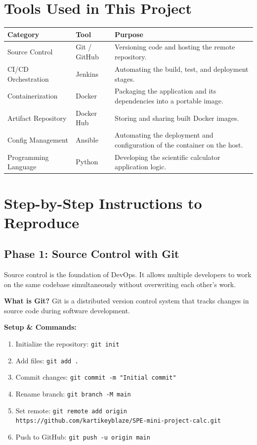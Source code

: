 \documentclass[12pt,a4paper]{article}
\begin{document}
\section{Tools Used in This Project}

\begin{longtable}{|p{3cm}|p{3cm}|p{7cm}|}
\hline
\textbf{Category} & \textbf{Tool} & \textbf{Purpose} \\
\hline
Source Control & Git / GitHub & Versioning code and hosting the remote repository. \\
\hline
CI/CD Orchestration & Jenkins & Automating the build, test, and deployment stages. \\
\hline
Containerization & Docker & Packaging the application and its dependencies into a portable image. \\
\hline
Artifact Repository & Docker Hub & Storing and sharing built Docker images. \\
\hline
Config Management & Ansible & Automating the deployment and configuration of the container on the host. \\
\hline
Programming Language & Python & Developing the scientific calculator application logic. \\
\hline
\end{longtable}

\section{Step-by-Step Instructions to Reproduce}

\subsection{Phase 1: Source Control with Git}

Source control is the foundation of DevOps. It allows multiple developers to work on the same codebase simultaneously without overwriting each other's work.

\textbf{What is Git?} Git is a distributed version control system that tracks changes in source code during software development.

\vspace{0.5em}
\textbf{Setup \& Commands:}
\begin{enumerate}[noitemsep]
  \item Initialize the repository: \texttt{git init}
  \item Add files: \texttt{git add .}
  \item Commit changes: \texttt{git commit -m "Initial commit"}
  \item Rename branch: \texttt{git branch -M main}
  \item Set remote: \texttt{git remote add origin https://github.com/kartikeyblaze/SPE-mini-project-calc.git}
  \item Push to GitHub: \texttt{git push -u origin main}
\end{enumerate}
\end{document}
